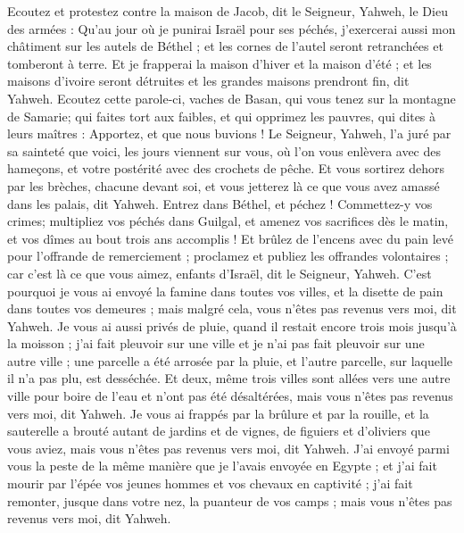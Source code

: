 \begin{multicols}{2}
Ecoutez et protestez contre la maison de Jacob, dit le Seigneur, Yahweh, le Dieu des armées :
Qu'au jour où je punirai Israël pour ses péchés, j'exercerai aussi mon châtiment sur les autels de Béthel ; et les cornes de l'autel seront retranchées et tomberont à terre.
Et je frapperai la maison d'hiver et la maison d'été ; et les maisons d'ivoire seront détruites et les grandes maisons prendront fin, dit Yahweh.
\VerseOne{}Ecoutez cette parole-ci, vaches de Basan, qui vous tenez sur la montagne de Samarie; qui faites tort aux faibles, et qui opprimez les pauvres, qui dites à leurs maîtres : Apportez, et que nous buvions !
Le Seigneur, Yahweh, l'a juré par sa sainteté que voici, les jours viennent sur vous, où l'on vous enlèvera avec des hameçons, et votre postérité avec des crochets de pêche.
Et vous sortirez dehors par les brèches, chacune devant soi, et vous jetterez là ce que vous avez amassé dans les palais, dit Yahweh.
Entrez dans Béthel, et péchez ! Commettez-y vos crimes; multipliez vos péchés dans Guilgal, et amenez vos sacrifices dès le matin, et vos dîmes au bout trois ans accomplis !
Et brûlez de l'encens avec du pain levé pour l'offrande de remerciement ; proclamez et publiez les offrandes volontaires ; car c'est là ce que vous aimez, enfants d'Israël, dit le Seigneur, Yahweh.
C'est pourquoi je vous ai envoyé la famine dans toutes vos villes, et la disette de pain dans toutes vos demeures ; mais malgré cela, vous n'êtes pas revenus vers moi, dit Yahweh.
Je vous ai aussi privés de pluie, quand il restait encore trois mois jusqu'à la moisson ; j'ai fait pleuvoir sur une ville et je n'ai pas fait pleuvoir sur une autre ville ; une parcelle a été arrosée par la pluie, et l'autre parcelle, sur laquelle il n'a pas plu, est desséchée.
Et deux, même trois villes sont allées vers une autre ville pour boire de l'eau et n'ont pas été désaltérées, mais vous n'êtes pas revenus vers moi, dit Yahweh.
Je vous ai frappés par la brûlure et par la rouille, et la sauterelle a brouté autant de jardins et de vignes, de figuiers et d'oliviers que vous aviez, mais vous n'êtes pas revenus vers moi, dit Yahweh.
J'ai envoyé parmi vous la peste de la même manière que je l'avais envoyée en Egypte ; et j'ai fait mourir par l'épée vos jeunes hommes et vos chevaux en captivité ; j'ai fait remonter, jusque dans votre nez, la puanteur de vos camps ; mais vous n'êtes pas revenus vers moi, dit Yahweh.

\end{multicols}
